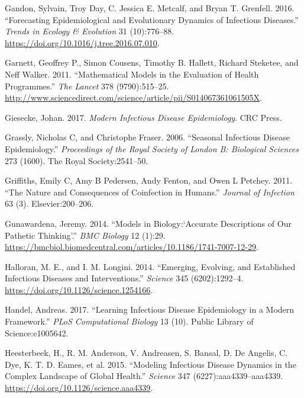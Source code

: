 \documentclass[]{book}
\theoremstyle{definition}
\theoremstyle{definition}
\theoremstyle{definition}
\theoremstyle{remark}
\begin{document}
\leavevmode\hypertarget{ref-gandon16}{}%
Gandon, Sylvain, Troy Day, C. Jessica E. Metcalf, and Bryan T. Grenfell.
2016. ``Forecasting Epidemiological and Evolutionary Dynamics of
Infectious Diseases.'' \emph{Trends in Ecology \& Evolution} 31
(10):776--88. \url{https://doi.org/10.1016/j.tree.2016.07.010}.

\leavevmode\hypertarget{ref-garnett11}{}%
Garnett, Geoffrey P., Simon Cousens, Timothy B. Hallett, Richard
Steketee, and Neff Walker. 2011. ``Mathematical Models in the Evaluation
of Health Programmes.'' \emph{The Lancet} 378 (9790):515--25.
\url{http://www.sciencedirect.com/science/article/pii/S014067361061505X}.

\leavevmode\hypertarget{ref-giesecke17}{}%
Giesecke, Johan. 2017. \emph{Modern Infectious Disease Epidemiology}.
CRC Press.

\leavevmode\hypertarget{ref-grassly06}{}%
Grassly, Nicholas C, and Christophe Fraser. 2006. ``Seasonal Infectious
Disease Epidemiology.'' \emph{Proceedings of the Royal Society of London
B: Biological Sciences} 273 (1600). The Royal Society:2541--50.

\leavevmode\hypertarget{ref-griffiths11}{}%
Griffiths, Emily C, Amy B Pedersen, Andy Fenton, and Owen L Petchey.
2011. ``The Nature and Consequences of Coinfection in Humans.''
\emph{Journal of Infection} 63 (3). Elsevier:200--206.

\leavevmode\hypertarget{ref-gunawardena14}{}%
Gunawardena, Jeremy. 2014. ``Models in Biology:`Accurate Descriptions of
Our Pathetic Thinking'.'' \emph{BMC Biology} 12 (1):29.
\url{https://bmcbiol.biomedcentral.com/articles/10.1186/1741-7007-12-29}.

\leavevmode\hypertarget{ref-halloran14}{}%
Halloran, M. E., and I. M. Longini. 2014. ``Emerging, Evolving, and
Established Infectious Diseases and Interventions.'' \emph{Science} 345
(6202):1292--4. \url{https://doi.org/10.1126/science.1254166}.

\leavevmode\hypertarget{ref-handel17}{}%
Handel, Andreas. 2017. ``Learning Infectious Disease Epidemiology in a
Modern Framework.'' \emph{PLoS Computational Biology} 13 (10). Public
Library of Science:e1005642.

\leavevmode\hypertarget{ref-heesterbeek15}{}%
Heesterbeek, H., R. M. Anderson, V. Andreasen, S. Bansal, D. De Angelis,
C. Dye, K. T. D. Eames, et al. 2015. ``Modeling Infectious Disease
Dynamics in the Complex Landscape of Global Health.'' \emph{Science} 347
(6227):aaa4339--aaa4339. \url{https://doi.org/10.1126/science.aaa4339}.
\end{document}
